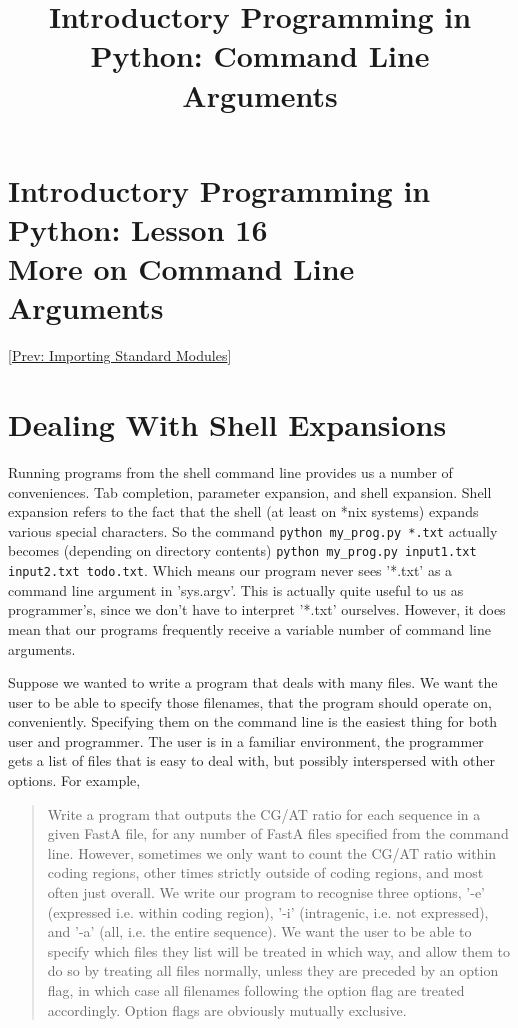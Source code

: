 \documentclass[a4paper,11pt]{article}
\title{Introductory Programming in Python: Command Line Arguments}
\begin{document}
\section{Introductory Programming in Python: Lesson 16
\\    More on Command Line Arguments}    [\href{importing_modules.html}{Prev: Importing Standard Modules}]   

\section{Dealing With Shell Expansions}

Running programs from the shell command line provides us a number of   conveniences. Tab completion, parameter expansion, and shell expansion.   Shell expansion refers to the fact that the shell (at least on *nix   systems) expands various special characters. So the command   
\texttt{python my\_prog.py *.txt} actually becomes (depending on   directory contents) 
\texttt{python my\_prog.py input1.txt input2.txt   todo.txt}. Which means our program never sees '*.txt' as a   command line argument in 'sys.argv'. This is actually quite useful to   us as programmer's, since we don't have to interpret '*.txt' ourselves.   However, it does mean that our programs frequently receive a variable   number of command line arguments.

Suppose we wanted to write a program that deals with many files. We   want the user to be able to specify those filenames, that the program   should operate on, conveniently. Specifying them on the command line is   the easiest thing for both user and programmer. The user is in a   familiar environment, the programmer gets a list of files that is easy   to deal with, but possibly interspersed with other options. For   example,
\begin{quotation}     Write a program that outputs the CG/AT ratio for each sequence in a    given FastA file, for any number of FastA files specified from the    command line. However, sometimes we only want to count the CG/AT    ratio within coding regions, other times strictly outside of coding    regions, and most often just overall. We write our program to    recognise three options, '-e' (expressed i.e. within coding    region), '-i' (intragenic, i.e. not expressed), and '-a' (all, i.e.    the entire sequence). We want the user to be able to specify which    files they list will be treated in which way, and allow them to do    so by treating all files normally, unless they are preceded by an    option flag, in which case all filenames following the option flag    are treated accordingly.  Option flags are obviously mutually    exclusive.    
\end{quotation}
\end{document}
